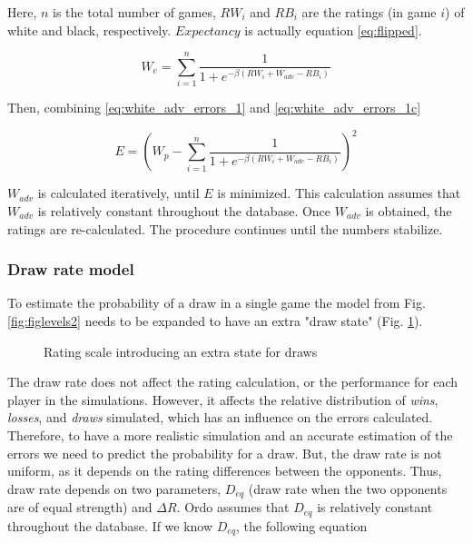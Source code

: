 \documentclass[12pt]{article}
\begin{document}
Here, $n$ is the total number of games, $RW_{i}$ and $RB_{i}$ are the ratings (in game $i$) of white and black, respectively.
$Expectancy$ is actually equation \ref{eq:flipped}.

	\begin{equation} \label{eq:white_adv_errors_1c}
	W_{e} = \sum\limits_{i=1}^n \frac{1}{1 + e^{-\beta(RW_{i} + W_{adv}-RB_{i})}}
	\end{equation}

Then, combining \ref{eq:white_adv_errors_1} and \ref{eq:white_adv_errors_1c}

	\begin{equation} \label{eq:white_adv_errors_1d}
	E = \left(W_{p} - \sum\limits_{i=1}^n \frac{1}{1 + e^{-\beta(RW_{i} + W_{adv}-RB_{i})}}\right)^2
	\end{equation}

$W_{adv}$ is calculated iteratively, until $E$ is minimized.
This calculation assumes that $W_{adv}$ is relatively constant throughout the database.
Once $W_{adv}$ is obtained, the ratings are re-calculated.
The procedure continues until the numbers stabilize.


\subsubsection*{Draw rate model}

To estimate the probability of a draw in a single game the model from Fig. \ref{fig:figlevels2} needs to be expanded to have an extra "draw state" (Fig. \ref{fig:threestates}).

	\begin{figure}[htb]
	\caption{\label{fig:threestates} Rating scale introducing an extra state for draws}
	\end{figure}


The draw rate does not affect the rating calculation, or the performance for each player in the simulations.
However, it affects the relative distribution of \textit{wins}, \textit{losses}, and \textit{draws} simulated, which has an influence on the errors calculated. 
Therefore, to have a more realistic simulation and an accurate estimation of the errors we need to predict the probability for a draw.
But, the draw rate is not uniform, as it depends on the rating differences between the opponents.
Thus, draw rate depends on two parameters, $D_{eq}$ (draw rate when the two opponents are of equal strength) and $\Delta R$.
Ordo assumes that $D_{eq}$ is relatively constant throughout the database.
If we know $D_{eq}$, the following equation
\end{document}
